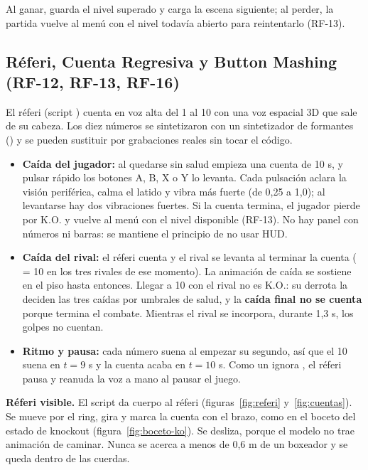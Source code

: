 Al ganar,  guarda el nivel superado y carga la escena siguiente; al perder, la partida vuelve al menú con el nivel todavía abierto para reintentarlo (RF-13).

\subsection{Réferi, Cuenta Regresiva y Button Mashing (RF-12, RF-13, RF-16)}
\label{sec:referi}
El réferi (script ) cuenta en voz alta del 1 al 10 con una voz espacial 3D que sale de su cabeza. Los diez números se sintetizaron con un sintetizador de formantes () y se pueden sustituir por grabaciones reales sin tocar el código.

\begin{itemize}
  \item \textbf{Caída del jugador:} al quedarse sin salud empieza una cuenta de 10 s, y pulsar rápido los botones A, B, X o Y lo levanta. Cada pulsación aclara la visión periférica, calma el latido y vibra más fuerte (de 0,25 a 1,0); al levantarse hay dos vibraciones fuertes. Si la cuenta termina, el jugador pierde por K.O. y vuelve al menú con el nivel disponible (RF-13). No hay panel con números ni barras: se mantiene el principio de no usar HUD.
  \item \textbf{Caída del rival:} el réferi cuenta y el rival se levanta al terminar la cuenta ( = 10 en los tres rivales de ese momento). La animación de caída se sostiene en el piso hasta entonces. Llegar a 10 con el rival no es K.O.: su derrota la deciden las tres caídas por umbrales de salud, y la \textbf{caída final no se cuenta} porque termina el combate. Mientras el rival se incorpora, durante 1,3 s, los golpes no cuentan.
  \item \textbf{Ritmo y pausa:} cada número suena al empezar su segundo, así que el 10 suena en $t = 9$ s y la cuenta acaba en $t = 10$ s. Como un  ignora , el réferi pausa y reanuda la voz a mano al pausar el juego.
\end{itemize}

\textbf{Réferi visible.} El script  da cuerpo al réferi (figuras~\ref{fig:referi} y~\ref{fig:cuentas}). Se mueve por el ring, gira y marca la cuenta con el brazo, como en el boceto del estado de knockout (figura~\ref{fig:boceto-ko}). Se desliza, porque el modelo no trae animación de caminar. Nunca se acerca a menos de 0,6 m de un boxeador y se queda dentro de las cuerdas.

